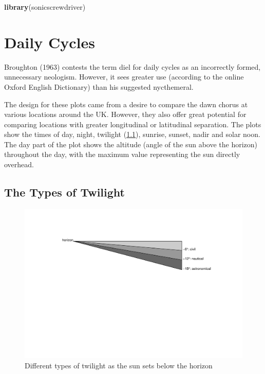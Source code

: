 \documentclass[
]{book}
\newenvironment{Shaded}{\begin{snugshade}}{\end{snugshade}}
\newcommand{\FunctionTok}[1]{\textcolor[rgb]{0.13,0.29,0.53}{\textbf{#1}}}
\newcommand{\NormalTok}[1]{#1}
\begin{document}
\begin{Shaded}
\begin{Highlighting}[]
\FunctionTok{library}\NormalTok{(sonicscrewdriver)}
\end{Highlighting}
\end{Shaded}

\hypertarget{daily-cycles}{%
\section{Daily Cycles}\label{daily-cycles}}

Broughton (1963) contests the term diel for daily cycles as an incorrectly formed, unnecessary neologism. However, it sees greater use (according to the online Oxford English Dictionary) than his suggested nycthemeral.

The design for these plots came from a desire to compare the dawn chorus at various locations around the UK. However, they also offer great potential for comparing locations with greater longitudinal or latitudinal separation. The plots show the times of day, night, twilight (\ref{twilight-types}), sunrise, sunset, nadir and solar noon. The day part of the plot shows the altitude (angle of the sun above the horizon) throughout the day, with the maximum value representing the sun directly overhead.

\hypertarget{twilight-types}{%
\subsection{The Types of Twilight}\label{twilight-types}}

\begin{figure}

{\centering \includegraphics[width=0.9\linewidth]{_main_files/figure-latex/twilights-1} 

}

\caption{Different types of twilight as the sun sets below the horizon}\label{fig:twilights}
\end{figure}
\end{document}

